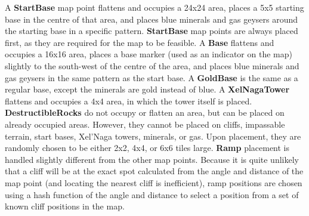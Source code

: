A \textbf{StartBase} map point flattens and occupies a 24x24 area, places a 5x5 starting base in the centre of that area, and places blue minerals and gas geysers around the starting base in a specific pattern. \textbf{StartBase} map points are always placed first, as they are required for the map to be feasible. A \textbf{Base} flattens and occupies a 16x16 area, places a base marker (used as an indicator on the map) slightly to the south-west of the centre of the area, and places blue minerals and gas geysers in the same pattern as the start base. A \textbf{GoldBase} is the same as a regular base, except the minerals are gold instead of blue. A \textbf{XelNagaTower} flattens and occupies a 4x4 area, in which the tower itself is placed. \textbf{DestructibleRocks} do not occupy or flatten an area, but can be placed on already occupied areas. However, they cannot be placed on cliffs, impassable terrain, start bases, Xel'Naga towers, minerals, or gas. Upon placement, they are randomly chosen to be either 2x2, 4x4, or 6x6 tiles large. \textbf{Ramp} placement is handled slightly different from the other map points. Because it is quite unlikely that a cliff will be at the exact spot calculated from the angle and distance of the map point (and locating the nearest cliff is inefficient), ramp positions are chosen using a hash function of the angle and distance to select a position from a set of known cliff positions in the map.